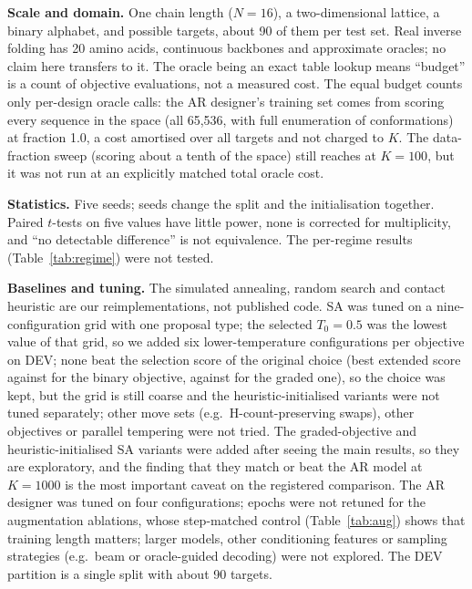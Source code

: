 \textbf{Scale and domain.} One chain length ($N=16$), a two-dimensional lattice, a binary alphabet, and  possible targets, about 90 of them per test set. Real inverse folding has 20 amino acids, continuous backbones and approximate oracles; no claim here transfers to it. The oracle being an exact table lookup means ``budget'' is a count of objective evaluations, not a measured cost. The equal budget counts only per-design oracle calls: the AR designer's training set comes from scoring every sequence in the space (all 65,536, with full enumeration of conformations) at fraction 1.0, a cost amortised over all targets and not charged to $K$. The data-fraction sweep (scoring about a tenth of the space) still reaches  at $K=100$, but it was not run at an explicitly matched total oracle cost.

\textbf{Statistics.} Five seeds; seeds change the split and the initialisation together. Paired $t$-tests on five values have little power, none is corrected for multiplicity, and ``no detectable difference'' is not equivalence. The per-regime results (Table~\ref{tab:regime}) were not tested.

\textbf{Baselines and tuning.} The simulated annealing, random search and contact heuristic are our reimplementations, not published code. SA was tuned on a nine-configuration grid with one proposal type; the selected $T_0=0.5$ was the lowest value of that grid, so we added six lower-temperature configurations per objective on DEV; none beat the selection score of the original choice (best extended score  against  for the binary objective,  against  for the graded one), so the choice was kept, but the grid is still coarse and the heuristic-initialised variants were not tuned separately; other move sets (e.g.\ H-count-preserving swaps), other objectives or parallel tempering were not tried. The graded-objective and heuristic-initialised SA variants were added after seeing the main results, so they are exploratory, and the finding that they match or beat the AR model at $K=1000$ is the most important caveat on the registered comparison. The AR designer was tuned on four configurations; epochs were not retuned for the augmentation ablations, whose step-matched control (Table~\ref{tab:aug}) shows that training length matters; larger models, other conditioning features or sampling strategies (e.g.\ beam or oracle-guided decoding) were not explored. The DEV partition is a single split with about 90 targets.

